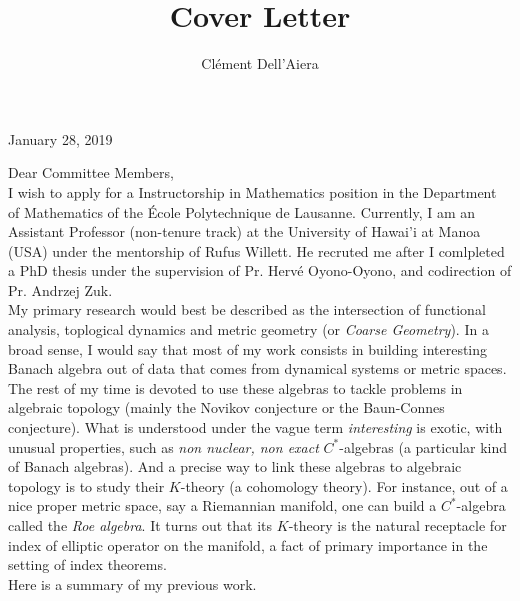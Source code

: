 \documentclass[a4paper]{article}
\title{Cover Letter}
\date{}
\author{ Cl\'ement Dell'Aiera}
\begin{document}
\maketitle
January 28, 2019

Dear Committee Members,\\

I wish to apply for a Instructorship in Mathematics position in the Department of Mathematics of the \'Ecole Polytechnique de Lausanne. Currently, I am an Assistant Professor (non-tenure track) at the University of Hawai'i at Manoa (USA) under the mentorship of Rufus Willett. He recruted me after I comlpleted a PhD thesis under the supervision of Pr. Hervé Oyono-Oyono, and codirection of Pr. Andrzej Zuk.\\

My primary research would best be described as the intersection of functional analysis, toplogical dynamics and metric geometry (or \textit{Coarse Geometry}). In a broad sense, I would say that most of my work consists in building interesting Banach algebra out of data that comes from dynamical systems or metric spaces. The rest of my time is devoted to use these algebras to tackle problems in algebraic topology (mainly the Novikov conjecture or the Baun-Connes conjecture). What is understood under the vague term \textit{interesting} is exotic, with unusual properties, such as \textit{non nuclear, non exact} $C^*$-algebras (a particular kind of Banach algebras). And a precise way to link these algebras to algebraic topology is to study their $K$-theory (a cohomology theory). For instance, out of a nice proper metric space, say a Riemannian manifold, one can build a $C^*$-algebra called the \textit{Roe algebra}. It turns out that its $K$-theory is the natural receptacle for index of elliptic operator on the manifold, a fact of primary importance in the setting of index theorems.\\    

Here is a summary of my previous work. \\
\end{document}
